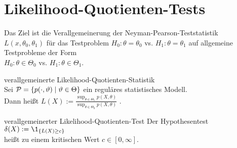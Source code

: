 \section{%
    Likelihood-Quotienten-Tests%
}

\begin{Bem}
    Das Ziel ist die Verallgemeinerung der Neyman-Pearson-Teststatistik $L(x, \theta_0, \theta_1)$
    für das Testproblem $H_0\colon \theta = \theta_0$ vs. $H_1\colon \theta = \theta_1$
    auf allgemeine Testprobleme der Form\\
    $H_0\colon \theta \in \Theta_0$ vs. $H_1\colon \theta \in \Theta_1$.
\end{Bem}

\begin{Def}{verallgemeinerte Likelihood-Quotienten-Statistik}\\
    Sei $\P = \{p(\cdot, \theta) \;|\; \theta \in \Theta\}$ ein reguläres statistisches Modell.\\
    Dann heißt $L(X) := \frac{\sup_{\theta \in \Theta_1} p(X, \theta)}
    {\sup_{\theta \in \Theta_0} p(X, \theta)}$
    .
\end{Def}

\begin{Def}{verallgemeinerter Likelihood-Quotienten-Test}
    Der Hypothesentest $\delta(X) := \1_{\{L(X) \ge c\}}$\\
    heißt  zu einem kritischen Wert
    $c \in [0, \infty]$.
\end{Def}

